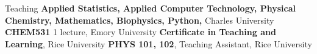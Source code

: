 \begin{rubric}{Teaching}
%
%
  \textbf{Applied Statistics, Applied Computer Technology, Physical Chemistry, Mathematics, Biophysics, Python,} Charles University
\entry*[\hspace{1.05cm}2021]%
  \textbf{CHEM531} 1 lecture, Emory University
\entry*[\hspace{1.05cm}2020]%
  \textbf{Certificate in Teaching and Learning}, Rice University
\entry*[2015 -- 2016]%
  \textbf{PHYS 101, 102}, Teaching Assistant, Rice University
\end{rubric}
